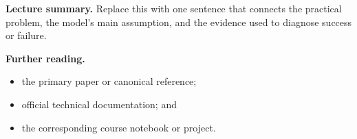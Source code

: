 \begin{widepar}
\medskip
{\small
\noindent\textcolor{LectureTeal}{\sffamily\bfseries Lecture summary.}
Replace this with one sentence that connects the practical problem, the model's main assumption, and the evidence used to diagnose success or failure.

\smallskip
\noindent\textcolor{LectureTeal}{\sffamily\bfseries Further reading.}
\begin{itemize}[leftmargin=1.35em, itemsep=0.05em, topsep=0.2em]\raggedright
  \item the primary paper or canonical reference;
  \item official technical documentation; and
  \item the corresponding course notebook or project.
\end{itemize}
}

\lectureacknowledgment{\LectureAcknowledgmentText}
\end{widepar}
